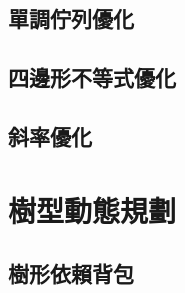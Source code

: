 \documentclass[12pt,a4paper,oneside]{report}
\begin{document}
\begin{CJK}{UTF8}{bkai}
\subsection{單調佇列優化}
\subsection{四邊形不等式優化}
\subsection{斜率優化}

\section{樹型動態規劃}

\subsection{樹形依賴背包}

\ifx \allfiles \undefined

\printindex[noun]
\clearpage

\end{CJK}
\end{document}
